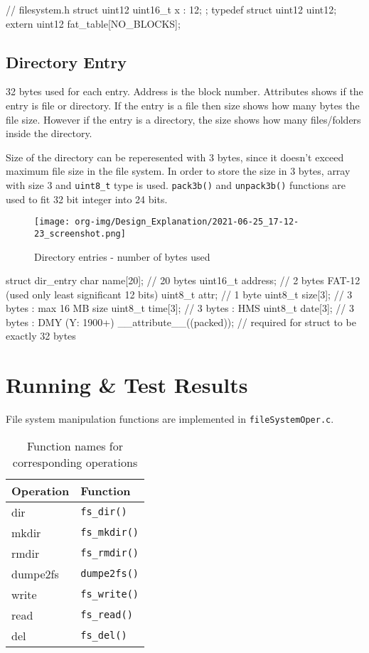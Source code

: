 \documentclass[a4paper]{article}
\begin{document}
\newpage

\begin{ccode}
// filesystem.h
struct uint12 {
  uint16_t x : 12;
};
typedef struct uint12 uint12;
extern uint12 fat_table[NO_BLOCKS];
\end{ccode}

\subsection*{Directory Entry}
\label{sec:org4ec3ae4}

32 bytes used for each entry. Address is the block number. Attributes shows if the entry is file or directory. If the entry is a file then size shows how many bytes the file size. However if the entry is a directory, the size shows how many files/folders inside the directory. 

Size of the directory can be reperesented with 3 bytes, since it doesn't exceed maximum file size in the file system. In order to store the size in 3 bytes, array with size 3 and \texttt{uint8\_t} type is used. \texttt{pack3b()} and \texttt{unpack3b()} functions are used to fit 32 bit integer into 24 bits.

\begin{figure}[htbp]
\centering
\texttt{[image: org-img/Design\_Explanation/2021-06-25\_17-12-23\_screenshot.png]}
\caption{Directory entries - number of bytes used}
\end{figure}

\begin{ccode}
struct dir_entry {
  char name[20];           // 20 bytes
  uint16_t address;        // 2 bytes FAT-12 (used only least significant 12 bits)
  uint8_t attr;            // 1 byte
  uint8_t size[3];         // 3 bytes : max 16 MB size
  uint8_t time[3];         // 3 bytes : HMS
  uint8_t date[3];         // 3 bytes : DMY (Y: 1900+)
} __attribute__((packed)); // required for struct to be exactly 32 bytes
\end{ccode}


\section*{Running \& Test Results}
\label{sec:org1917176}

File system manipulation functions are implemented in \texttt{fileSystemOper.c}.

\begin{table}[htbp]
\caption{Function names for corresponding operations}
\centering
\begin{tabular}{l|l}
Operation & Function\\
\hline
dir & \texttt{fs\_dir()}\\
mkdir & \texttt{fs\_mkdir()}\\
rmdir & \texttt{fs\_rmdir()}\\
dumpe2fs & \texttt{dumpe2fs()}\\
write & \texttt{fs\_write()}\\
read & \texttt{fs\_read()}\\
del & \texttt{fs\_del()}\\
\end{tabular}
\end{table}
\end{document}
